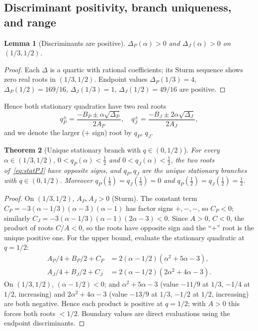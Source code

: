 \documentclass[11pt]{amsart}
\newtheorem{theorem}{Theorem}[section]
\newtheorem{lemma}[theorem]{Lemma}
\theoremstyle{definition}
\newcommand{\1}{\mathbf 1}
\begin{document}
\subsection{Discriminant positivity, branch uniqueness, and range}
\label{ssec:cert-branch}

\begin{lemma}[Discriminants are positive]
\label{lem:disc-positive}
$\Delta_P(\alpha) > 0$ and $\Delta_J(\alpha) > 0$ on $(1/3,1/2)$.
\end{lemma}

\begin{proof}
Each $\Delta$ is a quartic with rational coefficients; its Sturm sequence shows
zero real roots in $(1/3,1/2)$.  Endpoint values $\Delta_P(1/3)=4$,
$\Delta_P(1/2)=169/16$, $\Delta_J(1/3)=1$, $\Delta_J(1/2)=49/16$ are positive.
\end{proof}

Hence both stationary quadratics have two real roots
\[
   q^{\pm}_P = \frac{-B_P\pm\alpha\sqrt{\Delta_P}}{2A_P},
   \quad
   q^{\pm}_J = \frac{-B_J\pm 2\alpha\sqrt{\Delta_J}}{2A_J},
\]
and we denote the larger ($+$ sign) root by $q_P$, $q_J$.

\begin{theorem}[Unique stationary branch with $q\in(0,1/2)$]
\label{thm:branch-range}
For every $\alpha\in(1/3,1/2)$, $0 < q_P(\alpha) < \tfrac12$ and
$0 < q_J(\alpha) < \tfrac12$, the two roots of~\eqref{eq:statPJ} have opposite
signs, and $q_P,q_J$ are the unique stationary branches with $q\in(0,1/2)$.
Moreover $q_P(\tfrac13)=q_J(\tfrac13)=0$ and $q_P(\tfrac12)=q_J(\tfrac12)=\tfrac12$.
\end{theorem}

\begin{proof}
On $(1/3,1/2)$, $A_P,A_J>0$ (Sturm).  The constant term
$C_P=-3(\alpha-1/3)(\alpha-3)(\alpha-1)$ has factor signs $+,-,-$, so $C_P<0$;
similarly $C_J=-3(\alpha-1/3)(\alpha-1)(2\alpha-3)<0$.  Since $A>0$, $C<0$, the
product of roots $C/A<0$, so the roots have opposite sign and the ``$+$'' root is
the unique positive one.  For the upper bound, evaluate the stationary quadratic
at $q=1/2$:
\begin{align*}
A_P/4 + B_P/2 + C_P &= 2(\alpha-1/2)(\alpha^2+5\alpha-3), \\
A_J/4 + B_J/2 + C_J &= 2(\alpha-1/2)(2\alpha^2+4\alpha-3).
\end{align*}
On $(1/3,1/2)$, $(\alpha-1/2)<0$; and $\alpha^2+5\alpha-3$ (value $-11/9$ at
$1/3$, $-1/4$ at $1/2$, increasing) and $2\alpha^2+4\alpha-3$ (value $-13/9$ at
$1/3$, $-1/2$ at $1/2$, increasing) are both negative.  Hence each product is
positive at $q=1/2$; with $A>0$ this forces both roots $<1/2$.  Boundary values
are direct evaluations using the endpoint discriminants.
\end{proof}
\end{document}
